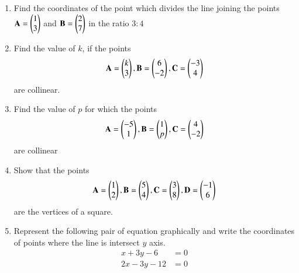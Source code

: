 \renewcommand{\theequation}{\theenumi}
\begin{enumerate}[label=\thesection.\arabic*.,ref=\thesection.\theenumi]

\item Find the coordinates of the point which divides the line joining the points $\mathbf{A}=\begin{pmatrix}1\\3\end{pmatrix}$ and $\mathbf{B}=\begin{pmatrix}2\\7\end{pmatrix}$ in the ratio $3:4$
\\
\solution



\item Find the value of $k$, if the points
\begin{align}
\mathbf {A}=\begin{pmatrix}k\\3\end{pmatrix},
\mathbf {B}=\begin{pmatrix}6\\-2\end{pmatrix},
\mathbf {C}=\begin{pmatrix}-3\\4\end{pmatrix}
\end{align}
are collinear.
\\
\solution

%
\item Find the value of $p$ for which the points
\begin{align}
\mathbf {A}=\begin{pmatrix}-5\\1\end{pmatrix},
\mathbf {B}=\begin{pmatrix}1\\p\end{pmatrix},
\mathbf {C}=\begin{pmatrix}4\\-2\end{pmatrix}
\end{align}
are collinear
\\
\solution


\item Show that the points 
\begin{align}
\mathbf {A}=\begin{pmatrix}1\\2\end{pmatrix},
\mathbf {B}=\begin{pmatrix}5\\4\end{pmatrix},
\mathbf {C}=\begin{pmatrix}3\\8\end{pmatrix},
\mathbf {D}=\begin{pmatrix}-1\\6\end{pmatrix}
\end{align}
are the vertices of a square.
\\
\solution

\item Represent the following pair of equation graphically and write the coordinates of points where the line is intersect $y$ axis.
\begin{align}
    x+3y-6&=0 \\
2x-3y-12&=0 
\end{align} 
\\
\solution



\end{enumerate}